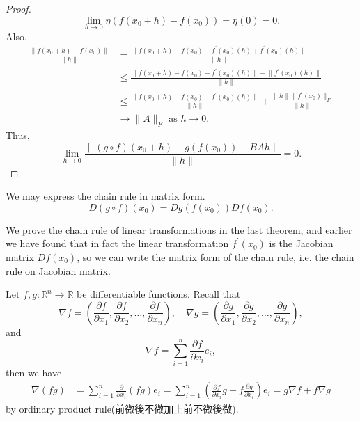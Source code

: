 \begin{proof}
    \[
        \lim_{h \to 0} \eta (f(x_0 + h) - f(x_0)) = \eta (0) = 0. 
    \]  
    Also, 
    \begin{align*}
        \frac{\lVert f(x_0 + h) - f(x_0) \rVert }{\lVert h \rVert } &= \frac{\lVert f(x_0 + h) - f(x_0) - f^{\prime} (x_0)(h) + f^{\prime} (x_0)(h) \rVert }{\lVert h \rVert } \\
        &\le \frac{\lVert f(x_0 + h) - f(x_0) - f^{\prime} (x_0)(h) \rVert + \lVert f^{\prime} (x_0)(h) \rVert  }{\lVert h \rVert } \\ 
        &\le \frac{\lVert f(x_0 + h) - f(x_0) - f^{\prime} (x_0)(h) \rVert }{\lVert h \rVert } + \frac{\lVert h \rVert \lVert f^{\prime} (x_0) \rVert_F  }{\lVert h \rVert } \\
        &\to \lVert A \rVert_F \text{ as } h \to 0. 
    \end{align*}
    Thus, 
    \[
        \lim_{h \to 0} \frac{\lVert (g \circ f)(x_0 + h) - g(f(x_0)) - BAh \rVert }{\lVert h \rVert } = 0. 
    \]
\end{proof}

\begin{corollary}
We may express the chain rule in matrix form.
    \[
        D(g \circ f)(x_0) = Dg(f(x_0)) Df(x_0).
    \]
\end{corollary}

\begin{remark}
    We prove the chain rule of linear transformations in the last theorem, and earlier we have found that in fact the linear transformation \(f^{\prime} (x_0)\) is the Jacobian matrix \(Df(x_0)\), so we can write the matrix form of the chain rule, i.e. the chain rule on Jacobian matrix.  
\end{remark}

\begin{eg}
    Let \(f, g : \mathbb{R} ^n \to \mathbb{R} \) be differentiable functions. Recall that 
    \[
        \nabla f = \left( \frac{\partial f}{\partial x_1}, \frac{\partial f}{\partial x_2}, \dots , \frac{\partial f}{\partial x_n}    \right), \quad \nabla g = \left( \frac{\partial g}{\partial x_1}, \frac{\partial g}{\partial x_2}, \dots , \frac{\partial g}{\partial x_n}    \right), 
    \]  
    and 
    \[
        \nabla f = \sum_{i=1}^n \frac{\partial f}{\partial x_i} e_i,  
    \]
    then we have 
    \begin{align*}
        \nabla (fg) &= \sum_{i=1}^n \frac{\partial }{\partial x_i} (fg) e_i = \sum_{i=1}^n \left( \frac{\partial f}{\partial x_i} g + f \frac{\partial g}{\partial x_i}    \right)e_i = g \nabla f + f \nabla g    
    \end{align*}
    by ordinary product rule(前微後不微加上前不微後微).
\end{eg}

